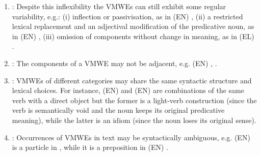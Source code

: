\documentclass[output=paper,
modfonts,
]{langscibook}
\begin{document}
\begin{enumerate}

\item\label{prop:variability} :  Despite this inflexibility the VMWEs can still exhibit some regular variability, e.g.: (i) inflection or passivisation, as in (EN) , (ii) a restricted lexical replacement and an  adjectival modification of the predicative noun, as in (EN) , (iii) omission of components without change in meaning, as in (EL) %
.
\item\label{prop:nonadj} : The components of a VMWE may not be adjacent, e.g. (EN) , . 
\item\label{prop:categ} : VMWEs of different categories may share the same syntactic structure and lexical choices. For instance,  (EN)  and (EN)  are combinations of the same verb with a direct object but the former is a light-verb construction (since the verb is semantically void and the noun keeps its original predicative meaning), while  the latter is an idiom (since the noun loses its original sense). 
\item\label{prop:synt-amb}:  Occurrences of VMWEs in text may be syntactically ambiguous, e.g. (EN)  is a particle in , while it is a preposition in (EN) . 

\end{enumerate}
\end{document}
